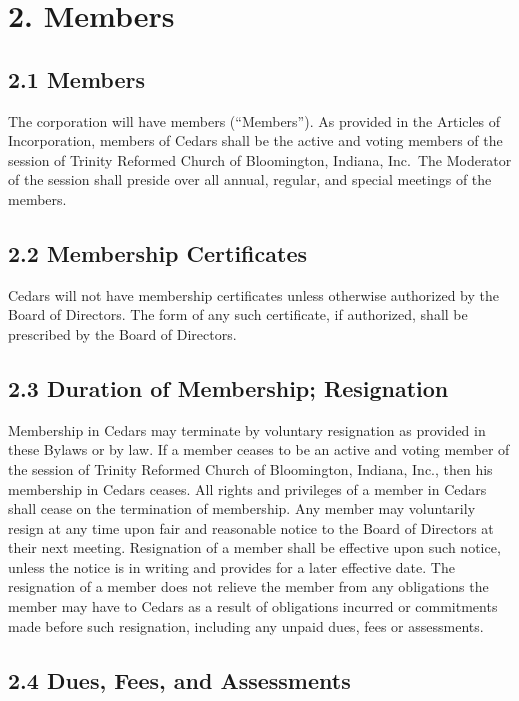 \documentclass[
]{book}
\begin{document}
\section{2. Members}\label{members}

\subsection{2.1 Members}\label{members-1}

The corporation will have members (``Members''). As provided in the Articles of Incorporation, members of Cedars shall be the active and voting members of the session of Trinity Reformed Church of Bloomington, Indiana, Inc.~The Moderator of the session shall preside over all annual, regular, and special meetings of the members.

\subsection{2.2 Membership Certificates}\label{membership-certificates}

Cedars will not have membership certificates unless otherwise authorized by the Board of Directors. The form of any such certificate, if authorized, shall be prescribed by the Board of Directors.

\subsection{2.3 Duration of Membership; Resignation}\label{duration-of-membership-resignation}

Membership in Cedars may terminate by voluntary resignation as provided in these Bylaws or by law. If a member ceases to be an active and voting member of the session of Trinity Reformed Church of Bloomington, Indiana, Inc., then his membership in Cedars ceases. All rights and privileges of a member in Cedars shall cease on the
termination of membership. Any member may voluntarily resign at any
time upon fair and reasonable notice to the Board of Directors at
their next meeting. Resignation of a member shall be effective upon
such notice, unless the notice is in writing and provides for a later
effective date. The resignation of a member does not relieve the
member from any obligations the member may have to Cedars as a result
of obligations incurred or commitments made before such resignation,
including any unpaid dues, fees or assessments.

\subsection{2.4 Dues, Fees, and Assessments}\label{dues-fees-and-assessments}
\end{document}
